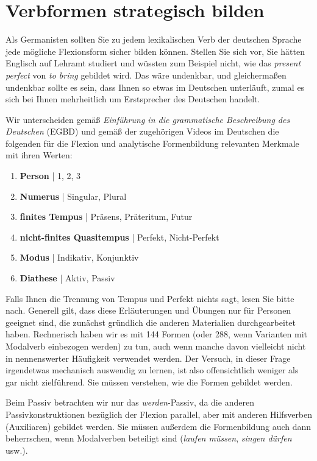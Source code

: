 \section{Verbformen strategisch bilden}

Als Germanisten sollten Sie zu jedem lexikalischen Verb der deutschen Sprache jede mögliche Flexionsform sicher bilden können.
Stellen Sie sich vor, Sie hätten Englisch auf Lehramt studiert und wüssten zum Beispiel nicht, wie das \textit{present perfect} von \textit{to bring} gebildet wird.
Das wäre undenkbar, und gleichermaßen undenkbar sollte es sein, dass Ihnen so etwas im Deutschen unterläuft, zumal es sich bei Ihnen mehrheitlich um Erstsprecher des Deutschen handelt.

Wir unterscheiden gemäß \textit{Einführung in die grammatische Beschreibung des Deutschen} (EGBD) und gemäß der zugehörigen Videos im Deutschen die folgenden für die Flexion und analytische Formenbildung relevanten Merkmale mit ihren Werten:

\begin{enumerate}\Lf
  \item \textbf{Person} | 1, 2, 3
  \item \textbf{Numerus} | Singular, Plural
  \item \textbf{finites Tempus} | Präsens, Präteritum, Futur
  \item \textbf{nicht-finites Quasitempus} | Perfekt, Nicht-Perfekt
  \item \textbf{Modus} | Indikativ, Konjunktiv
  \item \textbf{Diathese} | Aktiv, Passiv
\end{enumerate}

Falls Ihnen die Trennung von Tempus und Perfekt nichts sagt, lesen Sie bitte nach.
Generell gilt, dass diese Erläuterungen und Übungen nur für Personen geeignet sind, die zunächst gründlich die anderen Materialien durchgearbeitet haben.
Rechnerisch haben wir es mit 144 Formen (oder 288, wenn Varianten mit Modalverb einbezogen werden) zu tun, auch wenn manche davon vielleicht nicht in nennenswerter Häufigkeit verwendet werden.
Der Versuch, in dieser Frage irgendetwas mechanisch auswendig zu lernen, ist also offensichtlich weniger als gar nicht zielführend.
Sie müssen verstehen, wie die Formen gebildet werden.

Beim Passiv betrachten wir nur das \textit{werden}-Passiv, da die anderen Passivkonstruktionen bezüglich der Flexion parallel, aber mit anderen Hilfsverben (Auxiliaren) gebildet werden.
Sie müssen außerdem die Formenbildung auch dann beherrschen, wenn Modalverben beteiligt sind (\textit{laufen müssen}, \textit{singen dürfen} usw.).

